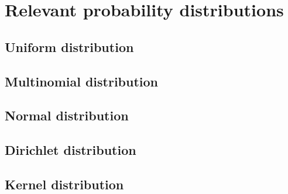 \chapter{Relevant probability distributions}
\label{chap:probdistributions}

\section*{Uniform distribution}

\section*{Multinomial distribution}

\section*{Normal distribution}

\section*{Dirichlet distribution}

\section*{Kernel distribution}

